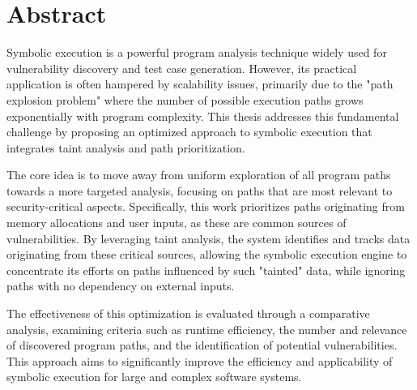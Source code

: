 \chapter{Abstract}

Symbolic execution is a powerful program analysis technique widely used for vulnerability discovery and test case generation. However, its practical application is often hampered by scalability issues, primarily due to the "path explosion problem" where the number of possible execution paths grows exponentially with program complexity. This thesis addresses this fundamental challenge by proposing an optimized approach to symbolic execution that integrates taint analysis and path prioritization.

The core idea is to move away from uniform exploration of all program paths towards a more targeted analysis, focusing on paths that are most relevant to security-critical aspects. Specifically, this work prioritizes paths originating from memory allocations and user inputs, as these are common sources of vulnerabilities. By leveraging taint analysis, the system identifies and tracks data originating from these critical sources, allowing the symbolic execution engine to concentrate its efforts on paths influenced by such "tainted" data, while ignoring paths with no dependency on external inputs.

The effectiveness of this optimization is evaluated through a comparative analysis, examining criteria such as runtime efficiency, the number and relevance of discovered program paths, and the identification of potential vulnerabilities. This approach aims to significantly improve the efficiency and applicability of symbolic execution for large and complex software systems.
